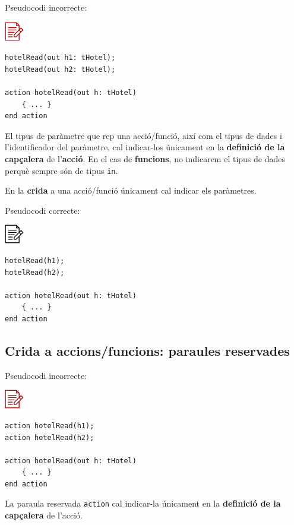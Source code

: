 \documentclass[
]{book}
\begin{document}
Pseudocodi incorrecte:

\includegraphics{./img/alg_err.png}

\begin{verbatim}
hotelRead(out h1: tHotel);
hotelRead(out h2: tHotel);

action hotelRead(out h: tHotel)
    { ... }
end action
\end{verbatim}

El tipus de paràmetre que rep una acció/funció, així com el tipus de dades i l'identificador del paràmetre, cal indicar-los únicament en la \textbf{definició de la capçalera} de l'\textbf{acció}. En el cas de \textbf{funcions}, no indicarem el tipus de dades perquè sempre són de tipus \texttt{in}.

En la \textbf{crida} a una acció/funció únicament cal indicar els paràmetres.

Pseudocodi correcte:

\includegraphics{./img/alg.png}

\begin{verbatim}
hotelRead(h1);
hotelRead(h2);

action hotelRead(out h: tHotel)
    { ... }
end action
\end{verbatim}

\hypertarget{crida-a-accionsfuncions-paraules-reservades}{%
\subsection{Crida a accions/funcions: paraules reservades}\label{crida-a-accionsfuncions-paraules-reservades}}

Pseudocodi incorrecte:

\includegraphics{./img/alg_err.png}

\begin{verbatim}
action hotelRead(h1);
action hotelRead(h2);

action hotelRead(out h: tHotel)
    { ... }
end action
\end{verbatim}

La paraula reservada \texttt{action} cal indicar-la únicament en la \textbf{definició de la capçalera} de l'acció.
\end{document}
